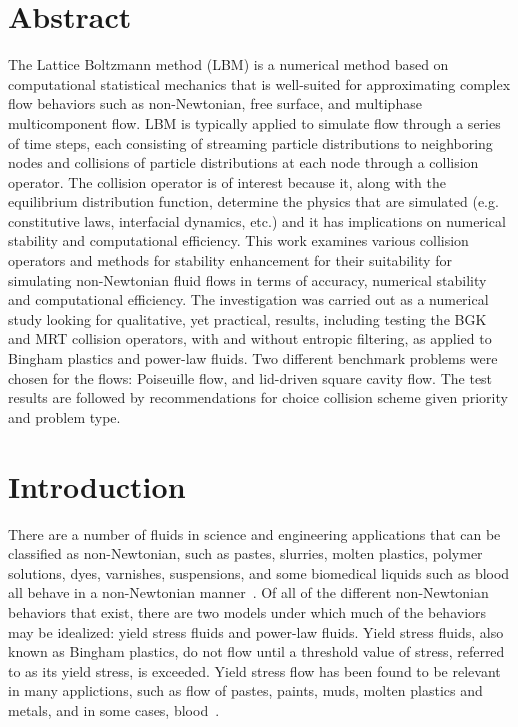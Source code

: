 \section*{Abstract}

The Lattice Boltzmann method (LBM) is a numerical method based on computational statistical mechanics that is well-suited for approximating complex flow behaviors such as non-Newtonian, free surface, and multiphase multicomponent flow.
LBM is typically applied to simulate flow through a series of time steps, each consisting of streaming particle distributions to neighboring nodes and collisions of particle distributions at each node through a collision operator.
The collision operator is of interest because it, along with the equilibrium distribution function, determine the physics that are simulated (e.g. constitutive laws, interfacial dynamics, etc.) and it has implications on numerical stability and computational efficiency.
This work examines various collision operators and methods for stability enhancement for their suitability for simulating non-Newtonian fluid flows in terms of accuracy, numerical stability and computational efficiency.
The investigation was carried out as a numerical study looking for qualitative, yet practical, results, including testing the BGK and MRT collision operators, with and without entropic filtering, as applied to Bingham plastics and power-law fluids.
Two different benchmark problems were chosen for the flows: Poiseuille flow, and lid-driven square cavity flow.
The test results are followed by recommendations for choice collision scheme given priority and problem type.

\section{Introduction} %

There are a number of fluids in science and engineering applications that can be classified as non-Newtonian, such as pastes, slurries, molten plastics, polymer solutions, dyes, varnishes, suspensions, and some biomedical liquids such as blood all behave in a non-Newtonian manner~\cite{bohme1987non}.
Of all of the different non-Newtonian behaviors that exist, there are two models under which much of the behaviors may be idealized: yield stress fluids and power-law fluids.
Yield stress fluids, also known as Bingham plastics, do not flow until a threshold value of stress, referred to as its yield stress, is exceeded.
Yield stress flow has been found to be relevant in many applictions, such as flow of pastes, paints, muds, molten plastics and metals, and in some cases, blood~\cite{wang2011lattice}. %

